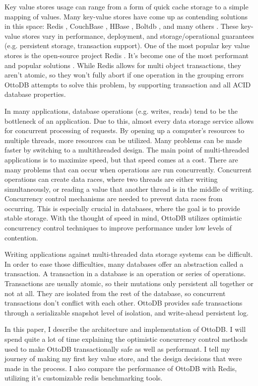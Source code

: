 \documentclass[conference]{IEEEtran}
\begin{document}
    Key value stores usage can range from a form of quick cache storage to a simple mapping of values. Many key-value stores have come up as contending solutions in this space: Redis \cite{b1}, CouchBase \cite{b3}, HBase \cite{b4}, Boltdb \cite{b5}, and many others \cite{b6, b7, b8}. These key-value stores vary in performance, deployment, and storage/operational guarantees (e.g. persistent storage, transaction support). One of the most popular key value stores is the open-source project Redis \cite{b1}. It’s become one of the most performant and popular solutions \cite{b27}. While Redis allows for multi object transactions, they aren’t atomic, so they won’t fully abort if one operation in the grouping errors \cite{b28} OttoDB attempts to solve this problem, by supporting transaction and all ACID database properties. 
    
    In many applications, database operations (e.g. writes, reads) tend to be the bottleneck of an application. Due to this, almost every data storage service allows for concurrent processing of requests. By opening up a computer’s resources to multiple threads, more resources can be utilized. Many problems can be made faster by switching to a multithreaded design. The main point of multi-threaded applications is to maximize speed, but that speed comes at a cost. There are many problems that can occur when operations are run concurrently. Concurrent operations can create data races, where two threads are either writing simultaneously, or reading a value that another thread is in the middle of writing. Concurrency control mechanisms are needed to prevent data races from occurring. This is especially crucial in databases, where the goal is to provide stable storage. With the thought of speed in mind, OttoDB utilizes optimistic concurrency control techniques to improve performance under low levels of contention. 
    
    Writing applications against multi-threaded data storage systems can be difficult. In order to ease those difficulties, many databases offer an abstraction called a transaction. A transaction in a database is an operation or series of operations. Transactions are usually atomic, so their mutations only persistent all together or not at all. They are isolated from the rest of the database, so concurrent transactions don’t conflict with each other. OttoDB provides safe transactions through a serializable snapshot level of isolation, and write-ahead persistent log.
    
    In this paper, I describe the architecture and implementation of OttoDB. I will spend quite a lot of time explaining the optimistic concurrency control methods used to make OttoDB transactionally safe as well as performant. I tell my journey of making my first key value store, and the design decisions that were made in the process. I also compare the performance of OttoDB with Redis, utilizing it’s customizable redis benchmarking tools.
    
\end{document}
